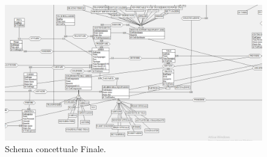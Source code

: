 \restoregeometry

\begin{figure}[H] %
	\centering
	\includegraphics[width=1.2\linewidth, height=1.2\textheight, keepaspectratio]{./img/Schema_Finale1.png} %
	\caption{Schema concettuale Finale.}
	\label{fig:schema_finale1}
\end{figure}

